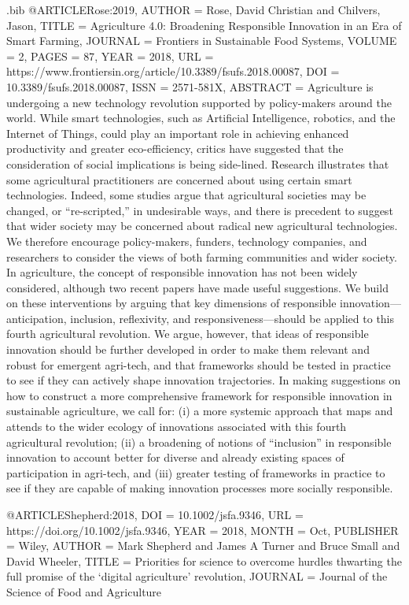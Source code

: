 \begin{filecontents}{\jobname.bib}
@ARTICLE{Rose:2019,
  AUTHOR = {Rose, David Christian and Chilvers, Jason},
  TITLE = {Agriculture 4.0: Broadening Responsible Innovation in an Era of Smart Farming},
  JOURNAL = {Frontiers in Sustainable Food Systems},
  VOLUME = {2},
  PAGES = {87},
  YEAR = {2018},
  URL = {https://www.frontiersin.org/article/10.3389/fsufs.2018.00087},       
  DOI = {10.3389/fsufs.2018.00087},      	
  ISSN = {2571-581X},   
  ABSTRACT = {Agriculture is undergoing a new technology revolution supported by policy-makers around the world. While smart technologies, such as Artificial Intelligence, robotics, and the Internet of Things, could play an important role in achieving enhanced productivity and greater eco-efficiency, critics have suggested that the consideration of social implications is being side-lined. Research illustrates that some agricultural practitioners are concerned about using certain smart technologies. Indeed, some studies argue that agricultural societies may be changed, or “re-scripted,” in undesirable ways, and there is precedent to suggest that wider society may be concerned about radical new agricultural technologies. We therefore encourage policy-makers, funders, technology companies, and researchers to consider the views of both farming communities and wider society. In agriculture, the concept of responsible innovation has not been widely considered, although two recent papers have made useful suggestions. We build on these interventions by arguing that key dimensions of responsible innovation—anticipation, inclusion, reflexivity, and responsiveness—should be applied to this fourth agricultural revolution. We argue, however, that ideas of responsible innovation should be further developed in order to make them relevant and robust for emergent agri-tech, and that frameworks should be tested in practice to see if they can actively shape innovation trajectories. In making suggestions on how to construct a more comprehensive framework for responsible innovation in sustainable agriculture, we call for: (i) a more systemic approach that maps and attends to the wider ecology of innovations associated with this fourth agricultural revolution; (ii) a broadening of notions of “inclusion” in responsible innovation to account better for diverse and already existing spaces of participation in agri-tech, and (iii) greater testing of frameworks in practice to see if they are capable of making innovation processes more socially responsible.}
}

@ARTICLE{Shepherd:2018,
  DOI = {10.1002/jsfa.9346},
  URL = {https://doi.org/10.1002/jsfa.9346},
  YEAR = {2018},
  MONTH = {Oct},
  PUBLISHER = {Wiley},
  AUTHOR = {Mark Shepherd and James A Turner and Bruce Small and David Wheeler},
  TITLE = {Priorities for science to overcome hurdles thwarting the full promise of the `digital agriculture' revolution},
  JOURNAL = {Journal of the Science of Food and Agriculture}     
}


\end{filecontents}
